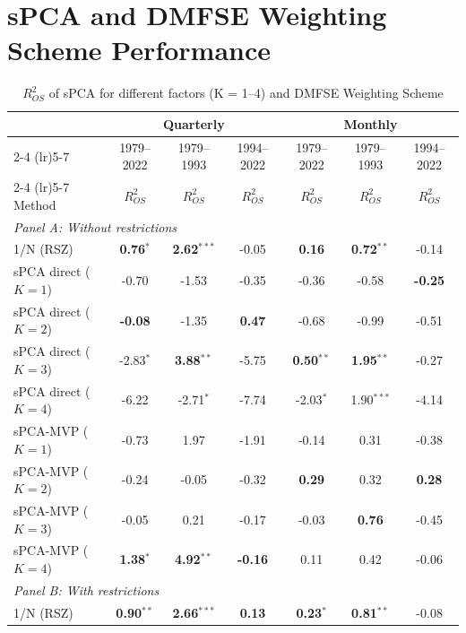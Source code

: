 \documentclass[a4paper,11pt]{article}
\begin{document}
\section{sPCA and DMFSE Weighting Scheme Performance}\label{app:spca_dmfse_performance}
\begin{table}[H]
\centering
\caption{$R^2_{OS}$ of sPCA for different factors (K = 1--4) and DMFSE Weighting Scheme}
\label{tab:spca_results_full_benchmarks}
\small
\begin{tabular}{lcccccc}
\hline
 & \multicolumn{3}{c}{Quarterly} & \multicolumn{3}{c}{Monthly} \\
\cmidrule(lr){2-4} \cmidrule(lr){5-7}
 & 1979--2022 & 1979--1993 & 1994--2022 
 & 1979--2022 & 1979--1993 & 1994--2022 \\
\cmidrule(lr){2-4} \cmidrule(lr){5-7}
Method 
& $R^2_{OS}$ & $R^2_{OS}$ & $R^2_{OS}$ 
& $R^2_{OS}$ & $R^2_{OS}$ & $R^2_{OS}$ \\
\hline
\multicolumn{7}{l}{\textit{Panel A: Without \citet{campbellthompson2008} restrictions}} \\[0.5ex]
1/N (RSZ) 
& \textbf{0.76}$^{*}$ & \textbf{2.62}$^{***}$ & -0.05 
& \textbf{0.16} & \textbf{0.72}$^{**}$ & -0.14 \\
\hline
sPCA direct ($K=1$) 
& -0.70 & -1.53 & -0.35 
& -0.36 & -0.58 & \textbf{-0.25} \\
sPCA direct ($K=2$) 
& \textbf{-0.08} & -1.35 & \textbf{0.47} 
& -0.68 & -0.99 & -0.51 \\
sPCA direct ($K=3$) 
& -2.83$^{*}$ & \textbf{3.88}$^{**}$ & -5.75 
& \textbf{0.50}$^{**}$ & \textbf{1.95}$^{**}$ & -0.27 \\
sPCA direct ($K=4$) 
& -6.22 & -2.71$^{*}$ & -7.74 
& -2.03$^{*}$ & 1.90$^{***}$ & -4.14 \\
\hline
sPCA-MVP ($K=1$) 
& -0.73 & 1.97 & -1.91 
& -0.14 & 0.31 & -0.38 \\
sPCA-MVP ($K=2$) 
& -0.24 & -0.05 & -0.32 
& \textbf{0.29} & 0.32 & \textbf{0.28} \\
sPCA-MVP ($K=3$) 
& -0.05 & 0.21 & -0.17 
& -0.03 & \textbf{0.76} & -0.45 \\
sPCA-MVP ($K=4$) 
& \textbf{1.38}$^{*}$ & \textbf{4.92}$^{**}$ & \textbf{-0.16} 
& 0.11 & 0.42 & -0.06 \\[1ex]
\multicolumn{7}{l}{\textit{Panel B: With \citet{campbellthompson2008} restrictions}} \\[0.5ex]
1/N (RSZ) 
& \textbf{0.90}$^{**}$ & \textbf{2.66}$^{***}$ & \textbf{0.13} 
& \textbf{0.23}$^{*}$ & \textbf{0.81}$^{**}$ & -0.08 \\

\end{tabular}
\end{table}
\end{document}
